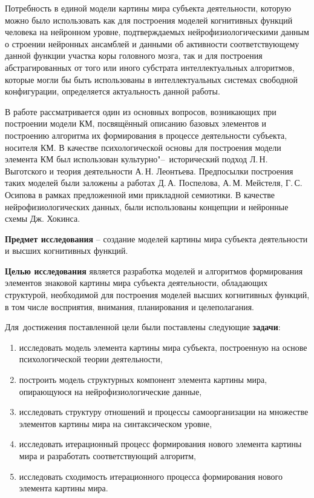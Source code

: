 Потребность в единой модели картины мира субъекта деятельности, которую можно было использовать как для построения моделей когнитивных функций человека на нейронном уровне, подтверждаемых нейрофизиологическими данным о строении нейронных ансамблей и данными об активности соответствующему данной функции участка коры головного мозга, так и для построения абстрагированных от того или иного субстрата интеллектуальных алгоритмов, которые могли бы быть использованы в интеллектуальных системах свободной конфигурации, определяется актуальность данной работы.

В работе рассматривается один из основных вопросов, возникающих при построении модели КМ, посвящённый описанию базовых элементов и построению алгоритма их формирования в процессе деятельности субъекта, носителя КМ. В качестве психологической основы для построения модели элемента КМ был использован культурно"--~исторический подход Л.\,Н. Выготского и теория деятельности А.\,Н. Леонтьева. Предпосылки построения таких моделей были заложены а работах Д.\,А. Поспелова, А.\,М. Мейстеля, Г.\,С. Осипова в рамках предложенной ими прикладной семиотики. В качестве нейрофизиологических данных, были использованы концепции и нейронные схемы Дж. Хокинса.

\textbf{Предмет исследования} -- создание моделей картины мира субъекта деятельности и высших когнитивных функций.

\textbf{Целью исследования} является разработка моделей и алгоритмов формирования элементов знаковой картины мира субъекта деятельности, обладающих структурой, необходимой для построения моделей высших когнитивных функций, в том числе восприятия, внимания, планирования и целеполагания.

Для~достижения поставленной цели были поставлены следующие \textbf{задачи}:
\begin{enumerate}
  \item исследовать модель элемента картины мира субъекта, построенную на основе психологической теории деятельности,
  \item построить модель структурных компонент элемента картины мира, опирающуюся на нейрофизиологические данные,
  \item исследовать структуру отношений и процессы самоорганизации на множестве элементов картины мира на синтаксическом уровне,
  \item исследовать итерационный процесс формирования нового элемента картины мира и разработать соответствующий алгоритм,
  \item исследовать сходимость итерационного процесса формирования нового элемента картины мира.
\end{enumerate}

